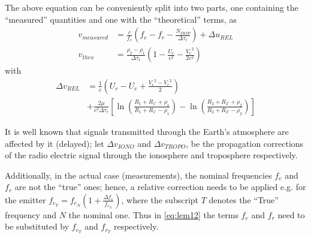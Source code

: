 The above equation can be conveniently split into two parts, one containing the ``measured'' 
quantities and one with the ``theoretical'' terms, as 
\begin{subequations}\label{eq:lem12}
  \begin{align}
    v_{measured} & = \frac{c}{f_e} (f_e - f_r -
     \frac{N_{DOP}}{\Delta\tau_r}) + \Delta u_{REL} \label{eq:lem12a} \\
    v_{theo}     &= \frac{\rho_2 - \rho_1}{\Delta\tau_r} (1- \frac{U_e}{c^2} - 
      \frac{{V_e}^2}{2 c^2}) \label{eq:lem12b}
  \end{align}
\end{subequations}
with
\begin{equation}
    \begin{split}
        \Delta v_{REL} &= \frac{1}{c} (U_r - U_e + \frac{{V_r}^2 - {V_e}^2}{2}) \\
        & + \frac{2 \mu}{c^2 \Delta\tau_r} [\ln{(\frac{R_1 + R_{1'} + \rho_1}{R_1 + R_{1'} - \rho_1})} - \ln{(\frac{R_2 + R_{2'} + \rho_2}{R_2 + R_{2'} - \rho_2})}]
    \end{split}
\end{equation}

It is well known that signals transmitted through the Earth's atmosphere are 
affected by it (delayed); let $\Delta v_{IONO}$ and $\Delta v_{TROPO}$, be the 
propagation corrections of the radio electric signal through the ionosphere and 
troposphere respectively. 

Additionally, in the actual case (measurements), the nominal frequencies $f_e$ and $f_r$ 
are not the ``true'' ones; hence, a relative correction needs to be applied e.g. for the 
emitter $f_{e_T} = f_{e_N} (1 + \frac{\Delta f_e}{f_{e_N}})$, where the subscript $T$ 
denotes the ``True'' frequency and $N$ the nominal one. Thus in \autoref{eq:lem12} the 
terms $f_e$ and $f_r$ need to be substituted by $f_{e_T}$ and $f_{r_T}$ respectively.


